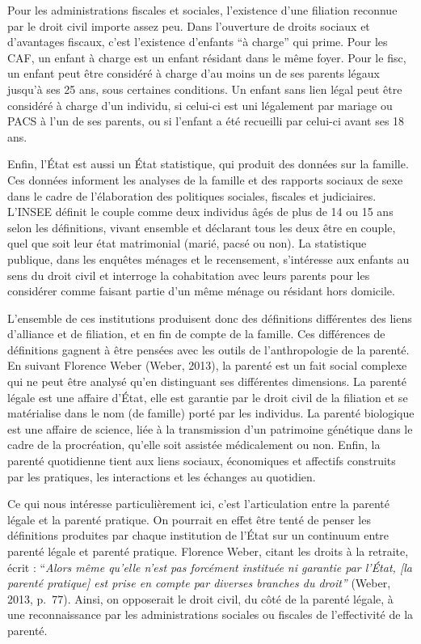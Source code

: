 \documentclass[
  12pt,
]{book}
\begin{document}
Pour les administrations fiscales et sociales, l'existence d'une
filiation reconnue par le droit civil importe assez peu. Dans
l'ouverture de droits sociaux et d'avantages fiscaux, c'est l'existence
d'enfants ``à charge'' qui prime. Pour les CAF, un enfant à charge est
un enfant résidant dans le même foyer. Pour le fisc, un enfant peut être
considéré à charge d'au moins un de ses parents légaux jusqu'à ses 25
ans, sous certaines conditions. Un enfant sans lien légal peut être
considéré à charge d'un individu, si celui-ci est uni légalement par
mariage ou PACS à l'un de ses parents, ou si l'enfant a été recueilli
par celui-ci avant ses 18 ans.

Enfin, l'État est aussi un État statistique, qui produit des données sur
la famille. Ces données informent les analyses de la famille et des
rapports sociaux de sexe dans le cadre de l'élaboration des politiques
sociales, fiscales et judiciaires. L'INSEE définit le couple comme deux
individus âgés de plus de 14 ou 15 ans selon les définitions, vivant
ensemble et déclarant tous les deux être en couple, quel que soit leur
état matrimonial (marié, pacsé ou non). La statistique publique, dans
les enquêtes ménages et le recensement, s'intéresse aux enfants au sens
du droit civil et interroge la cohabitation avec leurs parents pour les
considérer comme faisant partie d'un même ménage ou résidant hors
domicile.

L'ensemble de ces institutions produisent donc des définitions
différentes des liens d'alliance et de filiation, et en fin de compte de
la famille. Ces différences de définitions gagnent à être pensées avec
les outils de l'anthropologie de la parenté. En suivant Florence Weber
(Weber, 2013), la parenté est un fait social complexe qui ne peut être
analysé qu'en distinguant ses différentes dimensions. La parenté légale
est une affaire d'État, elle est garantie par le droit civil de la
filiation et se matérialise dans le nom (de famille) porté par les
individus. La parenté biologique est une affaire de science, liée à la
transmission d'un patrimoine génétique dans le cadre de la procréation,
qu'elle soit assistée médicalement ou non. Enfin, la parenté quotidienne
tient aux liens sociaux, économiques et affectifs construits par les
pratiques, les interactions et les échanges au quotidien.

Ce qui nous intéresse particulièrement ici, c'est l'articulation entre
la parenté légale et la parenté pratique. On pourrait en effet être
tenté de penser les définitions produites par chaque institution de
l'État sur un continuum entre parenté légale et parenté pratique.
Florence Weber, citant les droits à la retraite, écrit : ``\emph{Alors
même qu'elle n'est pas forcément instituée ni garantie par l'État, {[}la
parenté pratique{]} est prise en compte par diverses branches du
droit''} (Weber, 2013, p.~77). Ainsi, on opposerait le droit civil, du
côté de la parenté légale, à une reconnaissance par les administrations
sociales ou fiscales de l'effectivité de la parenté.
\end{document}
